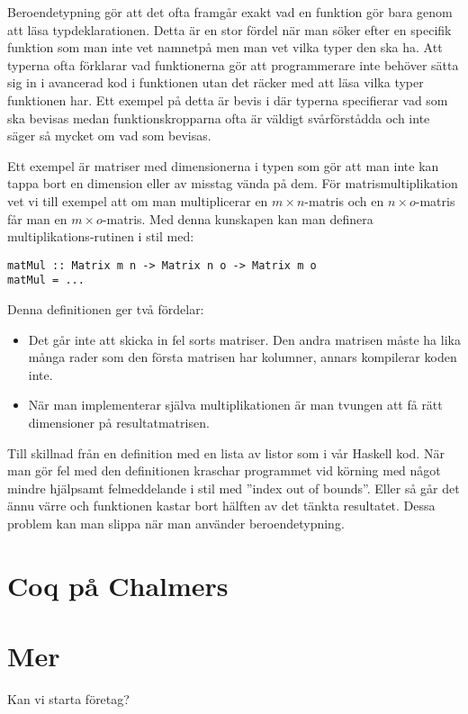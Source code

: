 Beroendetypning gör att det ofta framgår exakt vad en funktion gör bara genom
att läsa typdeklarationen. Detta är en stor fördel när man söker efter en
specifik funktion som man inte vet namnetpå men man vet vilka typer den ska ha.
Att typerna ofta förklarar vad funktionerna gör att programmerare inte behöver
sätta sig in i avancerad kod i funktionen utan det räcker med att läsa vilka
typer funktionen har. Ett exempel på detta är bevis i \coq där typerna
specifierar vad som ska bevisas medan funktionskropparna ofta är väldigt
svårförstådda och inte säger så mycket om vad som bevisas.

Ett exempel är matriser med dimensionerna i typen som gör att man inte kan
tappa bort en dimension eller av misstag vända på dem. För matrismultiplikation
vet vi till exempel att om man multiplicerar en $m \times n$-matris och en
$n \times o$-matris får man en $m \times o$-matris. Med denna kunskapen kan
man definera multiplikations-rutinen i stil med:

\begin{verbatim}
matMul :: Matrix m n -> Matrix n o -> Matrix m o
matMul = ...
\end{verbatim}

Denna definitionen ger två fördelar:

\begin{itemize}
  \item Det går inte att skicka in fel sorts matriser. Den andra matrisen måste
    ha lika många rader som den första matrisen har kolumner, annars kompilerar
    koden inte.
  \item När man implementerar själva multiplikationen är man tvungen att få rätt
    dimensioner på resultatmatrisen.
\end{itemize}

Till skillnad från en definition med en lista av listor som i vår Haskell kod.
När man gör fel med den definitionen kraschar programmet vid körning med något
mindre hjälpsamt felmeddelande i stil med ''index out of bounds''. Eller så går
det ännu värre och funktionen kastar bort hälften av det tänkta resultatet.
Dessa problem kan man slippa när man använder beroendetypning.

\section{Coq på Chalmers}

\section{Mer}
Kan vi starta företag?
